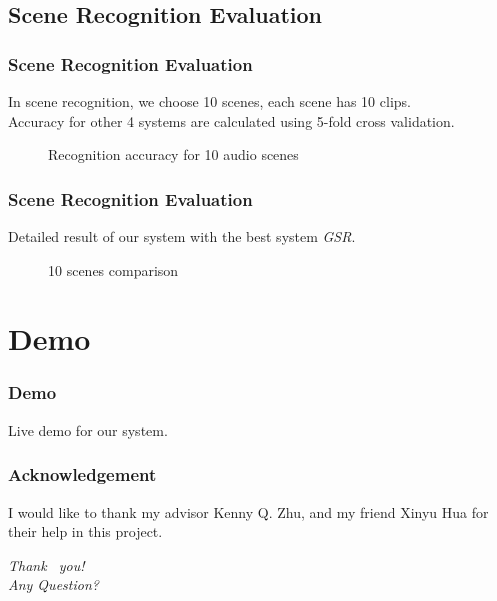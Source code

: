 \documentclass[xcolor=table,slidestop,compress,mathserif]{beamer}
\begin{document}
\subsection{Scene Recognition Evaluation}
\begin{frame}
	\frametitle{Scene Recognition Evaluation}
	In scene recognition, we choose 10 scenes, each scene has 10 clips. \\ 	
	Accuracy for other 4 systems are calculated using 5-fold cross validation.
	\begin{figure}[htb!]
	\centering
	\resizebox{0.8\totalheight}{!}{}
	\caption{Recognition accuracy for 10 audio scenes}
	\label{fig:sceneeval}
	\end{figure}
\end{frame}
\begin{frame}
	\frametitle{Scene Recognition Evaluation}
	Detailed result of our system with the best system \textit{GSR}. \\ 
	\begin{figure}[htb!]
	\centering
	\resizebox{0.8\totalheight}{!}{}
	\caption{10 scenes comparison}
	\label{fig:sceneeval}
	\end{figure}
\end{frame}
\section{Demo}
\begin{frame}
	\frametitle{Demo}
	Live demo for our system. 
\end{frame}
\begin{frame}
	\frametitle{Acknowledgement}
	I would like to thank my advisor Kenny Q. Zhu, and my friend Xinyu Hua for their help in this project. 
\end{frame}
\begin{frame}
  \begin{center}
    {\huge \emph{{Thank  ~you!
          \\   \vspace{1cm} Any Question?}}}
  \end{center}
\end{frame}
\end{document}
